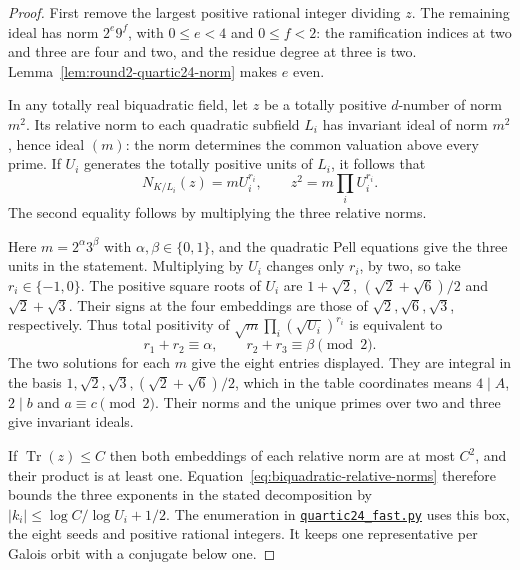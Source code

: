 \documentclass[11pt,reqno]{amsart}
\newcommand{\codefile}[1]{\href{https://github.com/sebastienpalcoux/grothendieck-ring-classification/blob/d5750105bb5758f3ad38d2e5464dfcc12c019816/supplements/rank6/sphericality/#1}{\nolinkurl{#1}}}
\theoremstyle{remark}\newtheorem{remark}[theorem]{Remark}
\numberwithin{equation}{section}
\begin{document}
\begin{proof}
First remove the largest positive rational integer dividing $z$.
The remaining ideal has norm $2^e9^f$, with $0\le e<4$ and
$0\le f<2$: the ramification indices at two and three are four and
two, and the residue degree at three is two. Lemma~\ref{lem:round2-quartic24-norm}
makes $e$ even.

In any totally real biquadratic field, let $z$ be a totally positive
$d$-number of norm $m^2$. Its relative norm to each quadratic
subfield $L_i$ has invariant ideal of norm $m^2$, hence ideal $(m)$:
the norm determines the common valuation above every prime. If $U_i$
generates the totally positive units of $L_i$, it follows that
\begin{equation}\label{eq:biquadratic-relative-norms}
 N_{K/L_i}(z)=mU_i^{r_i},\qquad z^2=m\prod_i U_i^{r_i}.
\end{equation}
The second equality follows by multiplying the three relative norms.

Here $m=2^\alpha3^\beta$ with $\alpha,\beta\in\{0,1\}$, and the
quadratic Pell equations give the three units in the statement.
Multiplying by $U_i$ changes only $r_i$, by two, so take
$r_i\in\{-1,0\}$. The positive square roots of $U_i$ are
$1+\sqrt2$, $(\sqrt2+\sqrt6)/2$ and $\sqrt2+\sqrt3$.
Their signs at the four embeddings are those of $\sqrt2,\sqrt6,\sqrt3$,
respectively. Thus total positivity of
$\sqrt m\prod_i(\sqrt{U_i})^{r_i}$ is equivalent to
\[
 r_1+r_2\equiv\alpha,\qquad r_2+r_3\equiv\beta\pmod2.
\]
The two solutions for each $m$ give the eight entries displayed.
They are integral in the basis $1,\sqrt2,\sqrt3,(\sqrt2+\sqrt6)/2$,
which in the table coordinates means
$4\mid A$, $2\mid b$ and $a\equiv c\pmod2$. Their norms and the
unique primes over two and three give invariant ideals.

If $\operatorname{Tr}(z)\le C$ then both embeddings of each relative
norm are at most $C^2$, and their product is at least one.
Equation~\eqref{eq:biquadratic-relative-norms} therefore bounds the
three exponents in the stated decomposition by
$|k_i|\le\log C/\log U_i+1/2$. The enumeration in
\codefile{quartic24_fast.py} uses this box, the eight seeds and
positive rational integers. It keeps one representative per Galois
orbit with a conjugate below one.
\end{proof}
\end{document}
